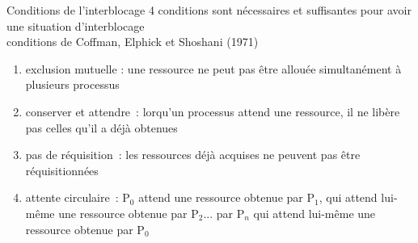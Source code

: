 

\begin {frame} {Conditions de l'interblocage}
    4 conditions sont nécessaires et suffisantes pour avoir une situation
    d'interblocage \\
    \implique conditions de Coffman, Elphick et Shoshani (1971)

    \begin {enumerate}
	\item exclusion mutuelle : une ressource ne peut pas être
	    allouée simultanément à plusieurs processus

	\item conserver et attendre~: lorqu'un processus attend une
	    ressource, il ne libère pas celles qu'il a déjà obtenues

	\item pas de réquisition~: les ressources déjà acquises ne
	    peuvent pas être réquisitionnées

	\item attente circulaire~: P$_0$ attend une ressource obtenue par
	    P$_1$, qui attend lui-même une ressource obtenue par P$_2$...
	    par P$_n$ qui attend lui-même une ressource obtenue par P$_0$

    \end {enumerate}

\end {frame}

